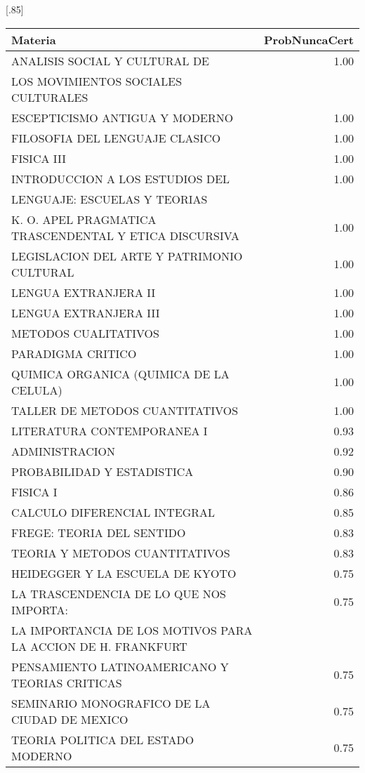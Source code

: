 \documentclass[12pt]{article}
\begin{document}
\begin{table}[ht]
\centering
\scalebox{0.75}[.85]{
\begin{tabular}{lr}
  \hline
 Materia & ProbNuncaCert \\ 
  \hline
 ANALISIS SOCIAL Y CULTURAL DE & 1.00 \\ 
 LOS MOVIMIENTOS SOCIALES CULTURALES &   \\ 
 ESCEPTICISMO ANTIGUA Y MODERNO & 1.00 \\ 
 FILOSOFIA DEL LENGUAJE CLASICO & 1.00 \\ 
 FISICA III & 1.00 \\ 
 INTRODUCCION A LOS ESTUDIOS DEL & 1.00 \\ 
 LENGUAJE: ESCUELAS Y TEORIAS &   \\ 
 K. O. APEL PRAGMATICA TRASCENDENTAL Y ETICA DISCURSIVA & 1.00 \\ 
 LEGISLACION DEL ARTE Y PATRIMONIO CULTURAL & 1.00 \\ 
 LENGUA EXTRANJERA II & 1.00 \\ 
 LENGUA EXTRANJERA III & 1.00 \\ 
 METODOS CUALITATIVOS & 1.00 \\ 
 PARADIGMA CRITICO & 1.00 \\ 
 QUIMICA ORGANICA (QUIMICA DE LA CELULA) & 1.00 \\ 
 TALLER DE METODOS CUANTITATIVOS & 1.00 \\ 
 LITERATURA CONTEMPORANEA I & 0.93 \\ 
 ADMINISTRACION & 0.92 \\ 
 PROBABILIDAD Y ESTADISTICA & 0.90 \\ 
 FISICA I & 0.86 \\ 
 CALCULO DIFERENCIAL INTEGRAL & 0.85 \\ 
 FREGE: TEORIA DEL SENTIDO & 0.83 \\ 
 TEORIA Y METODOS CUANTITATIVOS & 0.83 \\ 
 HEIDEGGER Y LA ESCUELA DE KYOTO & 0.75 \\ 
 LA TRASCENDENCIA DE LO QUE NOS IMPORTA:& 0.75 \\ 
 LA IMPORTANCIA DE LOS MOTIVOS PARA LA ACCION DE H. FRANKFURT &  \\ 
 PENSAMIENTO LATINOAMERICANO Y TEORIAS CRITICAS & 0.75 \\ 
 SEMINARIO MONOGRAFICO DE LA CIUDAD DE MEXICO & 0.75 \\ 
 TEORIA POLITICA DEL ESTADO MODERNO & 0.75 \\ 
   \hline
\end{tabular}}
\end{table}
\end{document}
